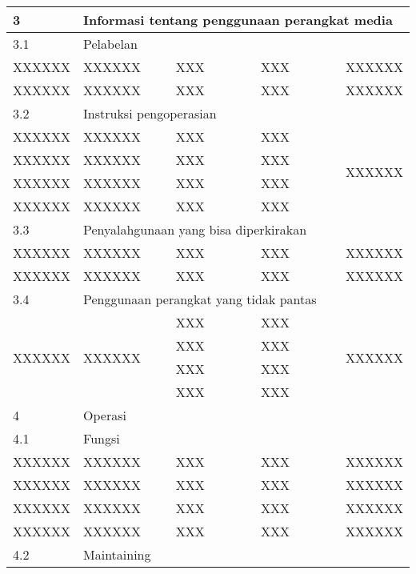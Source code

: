 \documentclass[11pt,a4paper,twoside,onecolumn]{book}
\begin{document}
\begin{table}
\begin{tabular}{p{0.1\linewidth} p{0.25\linewidth} p{0.25\linewidth} p{0.25\linewidth} p{0.15\linewidth}}
				
				\hline
				3 & \multicolumn{4}{l}{Informasi tentang penggunaan perangkat media} \\
				\hline
				3.1 & \multicolumn{4}{l}{Pelabelan} \\
				\hline
				{XXXXXX} & {XXXXXX} & {XXX} & {XXX} & {XXXXXX} \\
				\hline
				{XXXXXX} & {XXXXXX} & {XXX} & {XXX} & {XXXXXX} \\
				\hline
				3.2 & \multicolumn{4}{l}{Instruksi pengoperasian} \\
				\hline
				{XXXXXX} & {XXXXXX} & {XXX} & {XXX} & \multirow{4}{*}{XXXXXX} \\ \cline{1-4}
				{XXXXXX} & {XXXXXX} & {XXX} & {XXX} &  \\ \cline{1-4}
				{XXXXXX} & {XXXXXX} & {XXX} & {XXX} &  \\ \cline{1-4}
				{XXXXXX} & {XXXXXX} & {XXX} & {XXX} &  \\ \cline{1-4}
				\hline
				3.3 & \multicolumn{4}{l}{Penyalahgunaan yang bisa diperkirakan} \\
				\hline
				{XXXXXX} & {XXXXXX} & {XXX} & {XXX} & {XXXXXX} \\
				\hline
				{XXXXXX} & {XXXXXX} & {XXX} & {XXX} & {XXXXXX} \\
				\hline
				3.4 & \multicolumn{4}{l}{Penggunaan perangkat yang tidak pantas} \\
				\hline
				\multirow{4}{*}{XXXXXX} & \multirow{4}{*}{XXXXXX} 	& \multicolumn{1}{l}{XXX} & \multicolumn{1}{l}{XXX} & \multirow{4}{*}{XXXXXX} \\\cline{3-4}
										&	& \multicolumn{1}{l}{XXX} & \multicolumn{1}{l}{XXX} & \\ \cline{3-4}
										&	& \multicolumn{1}{l}{XXX} & \multicolumn{1}{l}{XXX} & \\ \cline{3-4}
										&	& \multicolumn{1}{l}{XXX} & \multicolumn{1}{l}{XXX} & \\ \hline
				\hline
				4 & \multicolumn{4}{l}{Operasi} \\
				\hline
				4.1 & \multicolumn{4}{l}{Fungsi} \\
				\hline
				{XXXXXX} & {XXXXXX} & {XXX} & {XXX} & {XXXXXX} \\
				\hline
				{XXXXXX} & {XXXXXX} & {XXX} & {XXX} & {XXXXXX} \\
				\hline
				{XXXXXX} & {XXXXXX} & {XXX} & {XXX} & {XXXXXX} \\
				\hline						
				{XXXXXX} & {XXXXXX} & {XXX} & {XXX} & {XXXXXX} \\
				\hline
				4.2 & \multicolumn{4}{l}{Maintaining} \\

\end{tabular}
\end{table}
\end{document}
